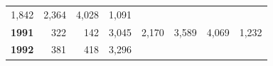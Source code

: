 \documentclass[]{article}
\begin{document}
\begin{longtable}[]{@{}rrrrrrrr@{}}
\begin{minipage}[t]{0.14\columnwidth}
1,842\strut
\end{minipage} & \begin{minipage}[t]{0.09\columnwidth}\raggedleft\strut
2,364\strut
\end{minipage} & \begin{minipage}[t]{0.08\columnwidth}\raggedleft\strut
4,028\strut
\end{minipage} & \begin{minipage}[t]{0.10\columnwidth}\raggedleft\strut
1,091\strut
\end{minipage}\tabularnewline
\begin{minipage}[t]{0.08\columnwidth}\raggedleft\strut
\textbf{1991}\strut
\end{minipage} & \begin{minipage}[t]{0.10\columnwidth}\raggedleft\strut
322\strut
\end{minipage} & \begin{minipage}[t]{0.11\columnwidth}\raggedleft\strut
142\strut
\end{minipage} & \begin{minipage}[t]{0.08\columnwidth}\raggedleft\strut
3,045\strut
\end{minipage} & \begin{minipage}[t]{0.14\columnwidth}\raggedleft\strut
2,170\strut
\end{minipage} & \begin{minipage}[t]{0.09\columnwidth}\raggedleft\strut
3,589\strut
\end{minipage} & \begin{minipage}[t]{0.08\columnwidth}\raggedleft\strut
4,069\strut
\end{minipage} & \begin{minipage}[t]{0.10\columnwidth}\raggedleft\strut
1,232\strut
\end{minipage}\tabularnewline
\begin{minipage}[t]{0.08\columnwidth}\raggedleft\strut
\textbf{1992}\strut
\end{minipage} & \begin{minipage}[t]{0.10\columnwidth}\raggedleft\strut
381\strut
\end{minipage} & \begin{minipage}[t]{0.11\columnwidth}\raggedleft\strut
418\strut
\end{minipage} & \begin{minipage}[t]{0.08\columnwidth}\raggedleft\strut
3,296\strut
\end{minipage} & \begin{minipage}[t]{0.14\columnwidth}\raggedleft\strut

\end{minipage}
\end{longtable}
\end{document}
